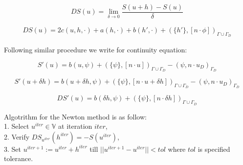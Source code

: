 \documentclass[a4paper,openany]{book}
\begin{document}
\begin{flushleft}
\begin{equation}
DS(u) = \lim_{\delta \to 0} \frac{S(u+h)-S(u)}{\delta}
\end{equation}
\end{flushleft}

\begin{flushleft}
\begin{equation}
\begin{split}
DS(u) = 2 c(u,h,\cdot) + a(h,\cdot) + b(h',\cdot) + (\{h'\},[n\cdot \phi])_{\Gamma \cup \Gamma_D}
\end{split}
\end{equation}
\end{flushleft}

Following similar procedure we write for continuity equation:\\
\begin{flushleft}
\begin{equation}
S'(u) = b(u,\psi) + (\{\psi\},[n \cdot u])_{\Gamma \cup \Gamma_D} - (\psi,n \cdot u_D)_{\Gamma_D}
\end{equation}
\end{flushleft}

\begin{flushleft}
\begin{equation}
S'(u+\delta h) = b(u + \delta h,\psi) + (\{\psi\},[n \cdot u + \delta h])_{\Gamma \cup \Gamma_D} - (\psi,n \cdot u_D)_{\Gamma_D}
\end{equation}
\end{flushleft}

\begin{flushleft}
\begin{equation}
DS'(u) = b(\delta h,\psi) + (\{\psi\},[n \cdot \delta h])_{\Gamma \cup \Gamma_D} 
\end{equation}
\end{flushleft}


Algotrithm for the Newton method is as follow:\\

1. Select $u^{iter} \in \mathbb{V}$ at iteration $iter$,\\

2. Verify $DS_{u^{iter}}(h^{iter}) = -S(u^{iter})$,\\

3. Set $u^{iter + 1} := u^{iter} + h^{iter}$ till $||u^{iter+1} - u^{iter}|| < tol$ where $tol$ is specified tolerance.\\
\end{document}
